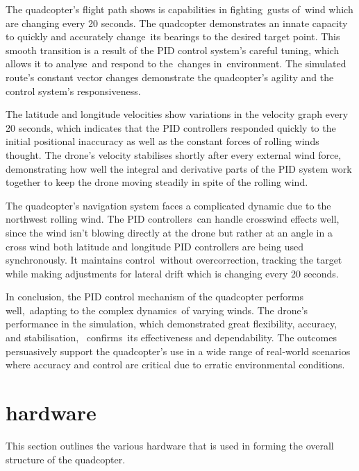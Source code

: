 \documentclass{article}
\begin{document}
The quadcopter's flight path shows is capabilities in fighting gusts of wind which are changing every 20 seconds. The quadcopter demonstrates an innate capacity to quickly and accurately change its bearings to the desired target point. This smooth transition is a result of the PID control system's careful tuning, which allows it to analyse and respond to the changes in environment. 
The simulated route's constant vector changes demonstrate the quadcopter's agility and the control system's responsiveness.

The latitude and longitude velocities show variations in the velocity graph every 20 seconds, which indicates that the PID controllers responded quickly to the initial positional inaccuracy as well as the constant forces of rolling winds thought. The drone’s velocity stabilises shortly after every external wind force, demonstrating how well the integral and 
derivative parts of the PID system work together to keep the drone moving steadily in spite of the rolling wind.

The quadcopter's navigation system faces a complicated dynamic due to the northwest rolling wind. The PID controllers can handle crosswind effects well, since the wind isn't blowing directly at the drone but rather at an angle in a cross wind both latitude and longitude PID controllers are being used synchronously. It maintains control without overcorrection, tracking the 
target while making adjustments for lateral drift which is changing every 20 seconds.

In conclusion, the PID control mechanism of the quadcopter performs well, adapting to the complex dynamics of varying winds. The drone's performance in the simulation, which demonstrated great flexibility, accuracy, and stabilisation,  confirms its effectiveness and dependability. The outcomes persuasively support the quadcopter's use in a wide range of real-world 
scenarios where accuracy and control are critical due to erratic environmental conditions.

\section{hardware}\label{hardware}
This section outlines the various hardware that is used in forming the overall structure of the quadcopter.
\end{document}
